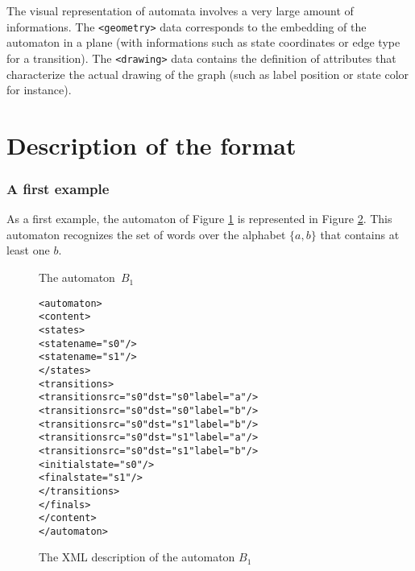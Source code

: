 \documentclass[a4paper]{llncs}
\newcommand{\medskipneg}{\vspace*{-2ex}} %
\newcommand{\contenttag}{\verb|<content>|\xpsace}
\newcommand{\statestag}{\verb|<states>|\xpsace}
\begin{document}
The visual representation of automata involves a very large amount of
informations.  The \verb|<geometry>| data corresponds to the embedding
of the automaton in a plane (with informations such as state
coordinates or edge type for a transition).  The \verb|<drawing>| data
contains the definition of attributes that characterize the actual
drawing of the graph (such as label position or state color for
instance). \\

\section{Description of the format}
\subsubsection{A first example}



As a first example, the automaton of Figure \ref{B1} is represented in
Figure \ref{B1xml}. This automaton recognizes the set of
words over the alphabet $\{a,b\}$ that contains at least one $b$.\\

\begin{figure}[ht]
\begin{center}
\end{center}
\vspace*{-.8cm}
\caption{The automaton~$B_1$}\label{B1}
\medskipneg
\end{figure}

{\small

\begin{figure}[h]
  \begin{center}
\begin{alltt}
<automaton>
  <content>
    <states>
       <state name="s0"/>
       <state name="s1"/>
    </states>
    <transitions>
       <transition src="s0" dst="s0" label="a"/>
       <transition src="s0" dst="s0" label="b"/>
       <transition src="s0" dst="s1" label="b"/>
       <transition src="s0" dst="s1" label="a"/>
       <transition src="s0" dst="s1" label="b"/>
       <initial state="s0"/>
       <final state="s1"/>
    </transitions>
    </finals>
  </content>
</automaton>
\end{alltt} 

\caption{The XML description of the automaton $B_1$}
\label{B1xml}
  \end{center}
\end{figure}
}
\end{document}
